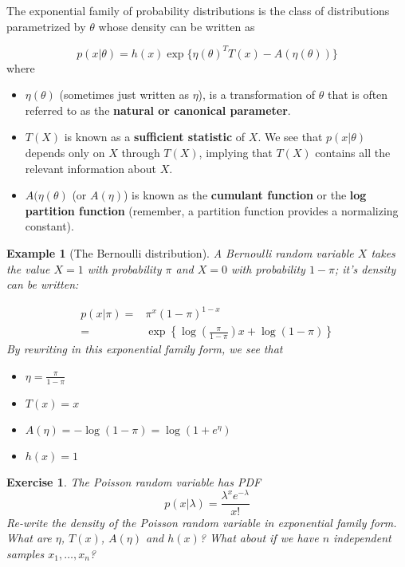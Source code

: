 \documentclass[twoside]{article}
\newcounter{lecnum}
\newtheorem{exercise}{Exercise}[lecnum]
\newtheorem{example}{Example}[lecnum]
\begin{document}
The exponential family of probability distributions is the class of distributions parametrized by $\theta$ whose density can be written as

$$p(x|\theta) = h(x)\exp\{\eta(\theta)^TT(x) - A(\eta(\theta))\}$$
where 
\begin{itemize}
\item $\eta(\theta)$ (sometimes just written as $\eta$), is a transformation of $\theta$ that is often referred to as the \textbf{natural or canonical parameter}.
\item $T(X)$ is known as a \textbf{sufficient statistic} of $X$. We see that $p(x|\theta)$ depends only on $X$ through $T(X)$, implying that $T(X)$ contains all the relevant information about $X$.
\item $A(\eta(\theta)$ (or $A(\eta)$) is known as the \textbf{cumulant function} or the \textbf{log partition function} (remember, a partition function provides a normalizing constant).
\end{itemize}

\begin{example}[The Bernoulli distribution]
  A Bernoulli random variable $X$ takes the value $X=1$ with probability $\pi$ and $X=0$ with probability $1-\pi$; it's density can be written:

  $$\begin{aligned}
    p(x|\pi) =& \pi^x(1-\pi)^{1-x}\\
    =& \exp\left\{\log\left(\frac{\pi}{1-\pi}\right)x + \log(1-\pi)\right\}\end{aligned}$$
    By rewriting in this exponential family form, we see that
    \begin{itemize}
    \item $\eta = \frac{\pi}{1-\pi}$
    \item $T(x) = x$
    \item $A(\eta) = -\log(1-\pi) = \log(1+e^{\eta})$
    \item $h(x)=1$
    \end{itemize}
\end{example}

\begin{exercise}
  The Poisson random variable has PDF
  $$p(x|\lambda) = \frac{\lambda^xe^{-\lambda}}{x!}$$
  Re-write the density of the Poisson random variable in exponential family form. What are $\eta$, $T(x)$, $A(\eta)$ and $h(x)$? What about if we have $n$ independent samples $x_1,\dots, x_n$?
\end{exercise}
\end{document}
